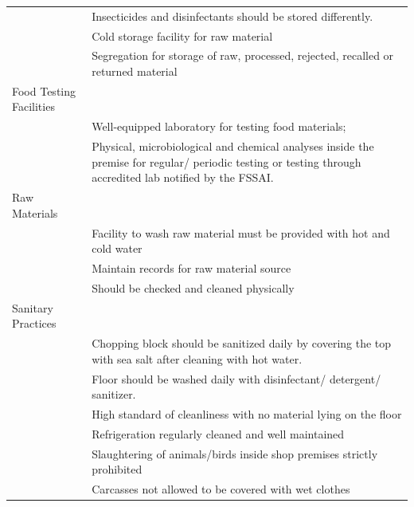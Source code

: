 \documentclass[a4paper, 12pt]{article}
\newcommand\tabitem{\makebox[1em][r]{\textbullet~}}
\begin{document}
\begin{longtable}{>{\raggedright}p{6.5cm}>{\raggedright\arraybackslash}p{8.5cm}}
	&	\newline{}\tabitem Insecticides and disinfectants should be stored differently.\\
	&	\newline{}\tabitem Cold storage facility for raw material\\
	&	\newline{}\tabitem Segregation for storage of raw, processed, rejected, recalled or returned material \\
    \midrule
    Food Testing Facilities	&	 \\
    \midrule
          & \tabitem Well-equipped laboratory for testing food materials;\\
	&  \newline{} \tabitem Physical, microbiological and chemical analyses inside the premise for regular/ periodic testing or testing through accredited lab notified by the FSSAI. \\
	    \midrule
    Raw Materials	&	 \\
    \midrule
          &	\tabitem Facility to wash raw material must be provided with hot and cold water\\
	&	\newline{} \tabitem Maintain records for raw material source\\
	&	\newline{}\tabitem Should be checked and cleaned physically \\
\midrule
Sanitary Practices	&	 \\
    \midrule
          &	\tabitem Chopping block should be sanitized daily by covering the top with sea salt after cleaning with hot water.\\
	&	\newline{}\tabitem Floor should be washed daily with disinfectant/ detergent/ sanitizer.\\
	&	\newline{}\tabitem High standard of cleanliness with no material lying on the floor\\
	&	\newline{}\tabitem Refrigeration regularly cleaned \newline{}and well maintained\\
	&	\newline{}\tabitem Slaughtering of animals/birds inside shop premises strictly prohibited\\
	&	\newline{}\tabitem Carcasses not allowed to be covered with wet clothes\\

\end{longtable}
\end{document}
